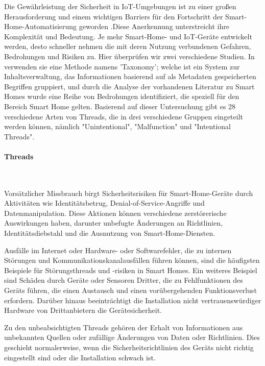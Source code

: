 Die Gewährleistung der Sicherheit in IoT-Umgebungen ist zu einer großen Herausforderung und einem wichtigen Barriers für den Fortschritt der Smart-Home-Automatisierung geworden \cite{10.1145/1978942.1979249} .Diese Anerkennung unterstreicht ihre Komplexität und Bedeutung.
Je mehr Smart-Home- und IoT-Geräte entwickelt werden, desto schneller nehmen die mit deren Nutzung verbundenen Gefahren, Bedrohungen und Risiken zu. Hier überprüfen wir zwei verschiedene Studien. In \cite{8344666} verwenden sie eine Methode namens 'Taxonomy'; welche ist ein System zur Inhaltsverwaltung, das Informationen basierend auf als Metadaten gespeicherten Begriffen gruppiert, und durch die Analyse der vorhandenen Literatur zu Smart Homes wurde eine Reihe von Bedrohungen identifiziert, die speziell für den Bereich Smart Home gelten. Basierend auf dieser Untersuchung gibt es 28 verschiedene Arten von Threads, die in drei verschiedene Gruppen eingeteilt werden können, nämlich "Unintentional", "Malfunction" und "Intentional Threads".

\paragraph{Threads}
\

Vorsätzlicher Missbrauch birgt Sicherheitsrisiken für Smart-Home-Geräte durch Aktivitäten wie Identitätsbetrug, Denial-of-Service-Angriffe und Datenmanipulation. Diese Aktionen können verschiedene zerstörerische Auswirkungen haben, darunter unbefugte Änderungen an Richtlinien, Identitätsdiebstahl und die Ausnutzung von Smart-Home-Diensten.

Ausfälle im Internet oder Hardware- oder Softwarefehler, die zu internen Störungen und Kommunikationskanalausfällen führen können, sind die häufigsten Beispiele für Störungsthreads und -risiken in Smart Homes. Ein weiteres Beispiel sind Schäden durch Geräte oder Sensoren Dritter, die zu Fehlfunktionen des Geräts führen, die einen Austausch und einen vorübergehenden Funktionsverlust erfordern. Darüber hinaus beeinträchtigt die Installation nicht vertrauenswürdiger Hardware von Drittanbietern die Gerätesicherheit.

Zu den unbeabsichtigten Threads gehören der Erhalt von Informationen aus unbekannten Quellen oder zufällige Änderungen von Daten oder Richtlinien. Dies geschieht normalerweise, wenn die Sicherheitsrichtlinien des Geräts nicht richtig eingestellt sind oder die Installation schwach ist.

